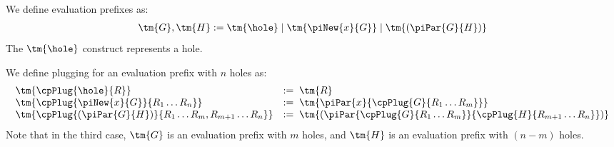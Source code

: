\begin{definition}\label{def:hccp-evaluation-prefixes}
  We define evaluation prefixes as:
  \begin{align*}
    \tm{G}, \tm{H} := \tm{\hole} \mid \tm{\piNew{x}{G}} \mid \tm{(\piPar{G}{H})}
  \end{align*}
  The $\tm{\hole}$ construct represents a hole.
\end{definition}
\begin{definition}[Plugging]\label{def:hccp-evaluation-prefix-plugging}
  We define plugging for an evaluation prefix with $n$ holes as:
  \begin{gather*}
    \begin{array}{ll}
      \tm{\cpPlug{\hole}{R}} & := \; \tm{R} \\
      \tm{\cpPlug{\piNew{x}{G}}{R_1 \dots R_n}}
                            & := \; \tm{\piPar{x}{\cpPlug{G}{R_1 \dots R_m}}} \\
      \tm{\cpPlug{(\piPar{G}{H})}{R_1 \dots R_m, R_{m+1} \dots R_{n}}}
                            & := \; \tm{(\piPar{\cpPlug{G}{R_1 \dots R_m}}{\cpPlug{H}{R_{m+1} \dots R_n}})}
    \end{array}
  \end{gather*}
  Note that in the third case, $\tm{G}$ is an evaluation prefix with $m$ holes,
  and $\tm{H}$ is an evaluation prefix with $(n-m)$ holes. 
\end{definition}
